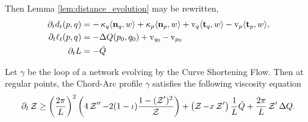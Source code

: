 \documentclass[11pt]{amsart}
\begin{document}
Then Lemma \ref{lem:distance_evolution} may be rewritten,
\begin{equation}
\label{eq:distance_evolution_q}
\begin{split}
\partial_t d_t(p, q) &= -\operatorname{\kappa}_q \langle{\operatorname{\mathbf{n}}_q},{w}\rangle + \operatorname{\kappa}_p \langle{\operatorname{\mathbf{n}}_p},{w}\rangle + \operatorname{v}_q \langle{\operatorname{\mathbf{t}}_q},{w}\rangle - \operatorname{v}_p \langle{\operatorname{\mathbf{t}}_p},{w}\rangle, \\
\partial_t \ell_t(p, q) &= -\Delta Q(p_0, q_0) + \operatorname{v}_{q_0} - \operatorname{v}_{p_0} \\
\partial_t L &= -\bar{Q}
\end{split}
\end{equation}

\begin{theorem}
\label{thm:csf_viscosity}

Let $\gamma$ be the loop of a network evolving by the Curve Shortening Flow. Then at regular points, the Chord-Arc profile $\gamma$ satisfies the following viscosity equation
\[
\partial_t \operatorname{\mathcal{Z}} \geq \left(\frac{2\pi}{L}\right)^2 \left(4 \operatorname{\mathcal{Z}}'' - 2 (1-\operatorname{\iota}) \frac{1 - (\operatorname{\mathcal{Z}}')^2}{\operatorname{\mathcal{Z}}}\right) + \left(\operatorname{\mathcal{Z}} - x \operatorname{\mathcal{Z}}'\right) \frac{1}{L} \bar{Q} + \frac{2\pi}{L} \operatorname{\mathcal{Z}}' \Delta Q.
\]
\end{theorem}
\end{document}
